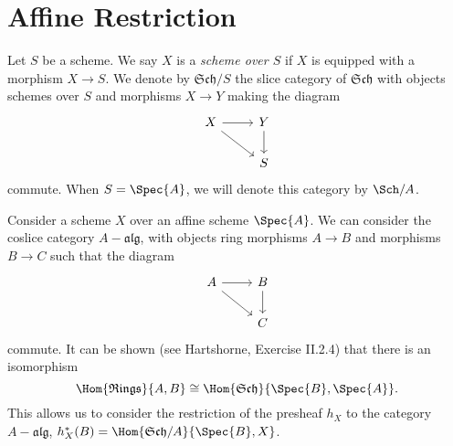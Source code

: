\documentclass[10pt]{amsart}
\begin{document}
\section{Affine Restriction}
\begin{defn}
  Let $S$ be a scheme.
  We say $X$ is a {\em scheme over $S$} if $X$ is equipped with a morphism $X \rightarrow S$.
  We denote by $\mathfrak{Sch}/S$ the slice category of $\mathfrak{Sch}$ with objects schemes over $S$ and morphisms $X \rightarrow Y$ making the diagram
  $$\begin{tikzcd}
    X\arrow{r}\arrow{rd} & Y\arrow{d}\\
    & S
  \end{tikzcd}$$
  commute.
  When $S = \Spec{A}$, we will denote this category by $\Sch/A$.
\end{defn}

Consider a scheme $X$ over an affine scheme $\Spec{A}$.
We can consider the coslice category $A-\mathfrak{alg}$, with objects ring morphisms $A \rightarrow B$ and morphisms $B \rightarrow C$ such that the diagram
$$\begin{tikzcd}
  A\arrow{r}\arrow{rd} & B\arrow{d}\\
  & C
\end{tikzcd}$$
commute.
It can be shown (see Hartshorne, Exercise II.2.4) that there is an isomorphism
$$\Hom{\mathfrak{Rings}}{A,B} \cong \Hom{\mathfrak{Sch}}{\Spec{B}, \Spec {A}}.$$
This allows us to consider the restriction of the presheaf $h_X$ to the category $A-\mathfrak{alg}$, $h_X^*(B) = \Hom{\mathfrak{Sch}/A}{\Spec{B}, X}$.
\end{document}
